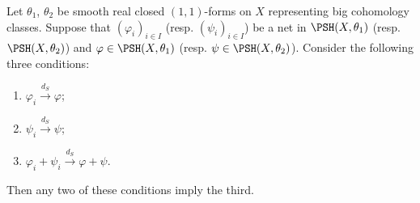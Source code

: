 \begin{theorem}\label{thm:dSadditivity}
    Let $\theta_1$, $\theta_2$ be smooth real closed $(1,1)$-forms on $X$ representing big cohomology classes. Suppose that $(\varphi_i)_{i\in I}$ (resp. $(\psi_i)_{i\in I}$) be a net in $\PSH(X,\theta_1)$ (resp. $\PSH(X,\theta_2)$) and $\varphi\in \PSH(X,\theta_1)$ (resp. $\psi\in \PSH(X,\theta_2)$).
    Consider the following three conditions:
    \begin{enumerate}
        \item\label{itm:thm:dSadditivity:1} $\varphi_i\xrightarrow{d_{S}}\varphi$;
        \item\label{itm:thm:dSadditivity:2} $\psi_i\xrightarrow{d_{S}}\psi$;
        \item\label{itm:thm:dSadditivity:3} $\varphi_i+\psi_i\xrightarrow{d_{S}}\varphi+\psi$.
    \end{enumerate}
    Then any two of these conditions imply the third.
\end{theorem}
